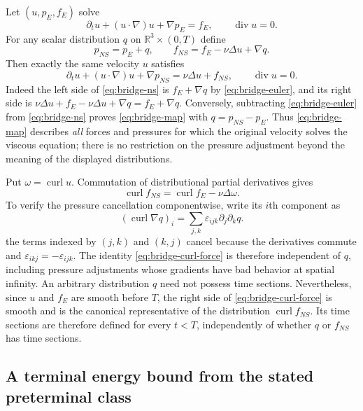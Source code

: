 Let $(u,p_E,f_E)$ solve
\begin{equation}\label{eq:bridge-euler}
 \partial_tu+(u\cdot\nabla)u+\nabla p_E=f_E,
 \qquad \operatorname{div}u=0.
\end{equation}
For any scalar distribution $q$ on $\mathbb R^3\times(0,T)$ define
\begin{equation}\label{eq:bridge-map}
 p_{NS}=p_E+q,\qquad f_{NS}=f_E-\nu\Delta u+\nabla q.
\end{equation}
Then exactly the same velocity $u$ satisfies
\begin{equation}\label{eq:bridge-ns}
 \partial_tu+(u\cdot\nabla)u+\nabla p_{NS}
       =\nu\Delta u+f_{NS},\qquad \operatorname{div}u=0.
\end{equation}
Indeed the left side of \eqref{eq:bridge-ns} is $f_E+\nabla q$ by
\eqref{eq:bridge-euler}, and its right side is
$\nu\Delta u+f_E-\nu\Delta u+\nabla q=f_E+\nabla q$.
Conversely, subtracting \eqref{eq:bridge-euler} from
\eqref{eq:bridge-ns} proves \eqref{eq:bridge-map} with
$q=p_{NS}-p_E$.  Thus \eqref{eq:bridge-map} describes \emph{all} forces
and pressures for which the original velocity solves the viscous equation;
there is no restriction on the pressure adjustment beyond the meaning of
the displayed distributions.

Put $\omega=\operatorname{curl}u$.  Commutation of distributional partial
derivatives gives
\begin{equation}\label{eq:bridge-curl-force}
 \operatorname{curl}f_{NS}
     =\operatorname{curl}f_E-\nu\Delta\omega.
\end{equation}
To verify the pressure cancellation componentwise, write its $i$th component as
\[
(\operatorname{curl}\nabla q)_i
=\sum_{j,k}\varepsilon_{ijk}\partial_j\partial_kq.
\]
the terms indexed by $(j,k)$ and $(k,j)$ cancel because the derivatives
commute and $\varepsilon_{ikj}=-\varepsilon_{ijk}$.
The identity \eqref{eq:bridge-curl-force} is therefore independent of $q$,
including pressure adjustments whose gradients have bad behavior at
spatial infinity.  An arbitrary distribution $q$ need not possess time
sections.  Nevertheless, since $u$ and $f_E$ are smooth before $T$, the
right side of \eqref{eq:bridge-curl-force} is smooth and is the canonical
representative of the distribution $\operatorname{curl}f_{NS}$.  Its
time sections are therefore defined for every $t<T$, independently of
whether $q$ or $f_{NS}$ has time sections.

\subsection{A terminal energy bound from the stated preterminal class}

